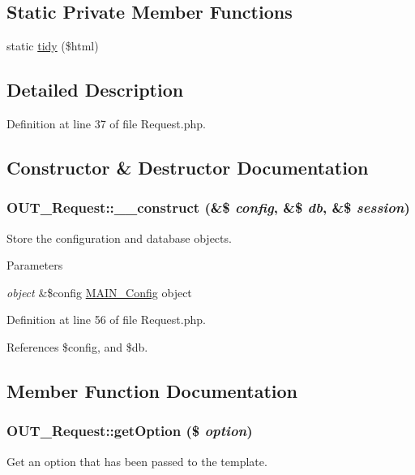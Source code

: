 \subsection*{Static Private Member Functions}
\begin{DoxyCompactItemize}
\item 
static \hyperlink{classOUT__Request_a7106b7d90946eacf1688d089c12722f0}{tidy} (\$html)
\end{DoxyCompactItemize}


\subsection{Detailed Description}


Definition at line 37 of file Request.php.

\subsection{Constructor \& Destructor Documentation}
\hypertarget{classOUT__Request_a749906f7ca9aeb506814d71f0215e380}{
\subsubsection[{\_\-\_\-construct}]{\setlength{\rightskip}{0pt plus 5cm}OUT\_\-Request::\_\-\_\-construct (\&\$ {\em config}, \/  \&\$ {\em db}, \/  \&\$ {\em session})}}
\label{de/d53/classOUT__Request_a749906f7ca9aeb506814d71f0215e380}
Store the configuration and database objects.


\begin{DoxyParams}{Parameters}
\item[{\em object}]\&\$config \hyperlink{classMAIN__Config}{MAIN\_\-Config} object \end{DoxyParams}


Definition at line 56 of file Request.php.

References \$config, and \$db.

\subsection{Member Function Documentation}
\hypertarget{classOUT__Request_aaa4a74668b18665c9408f57dd0556f98}{
\subsubsection[{getOption}]{\setlength{\rightskip}{0pt plus 5cm}OUT\_\-Request::getOption (\$ {\em option})}}
\label{de/d53/classOUT__Request_aaa4a74668b18665c9408f57dd0556f98}
Get an option that has been passed to the template.



